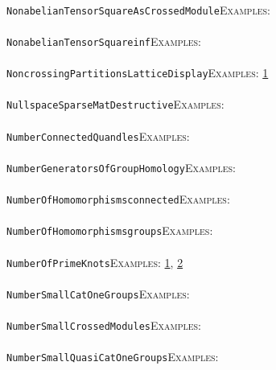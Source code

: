 \documentclass[a4paper,11pt]{report}
\begin{document}
{{ \\
 \texttt{NonabelianTensorSquareAsCrossedModule}{\nobreakspace}{\nobreakspace}{\nobreakspace}{\nobreakspace}\textsc{Examples:} \\
 \\
 \texttt{NonabelianTensorSquare{\textunderscore}inf}{\nobreakspace}{\nobreakspace}{\nobreakspace}{\nobreakspace}\textsc{Examples:} \\
 \\
 \texttt{NoncrossingPartitionsLatticeDisplay}{\nobreakspace}{\nobreakspace}{\nobreakspace}{\nobreakspace}\textsc{Examples:} \href{../www/SideLinks/About/aboutNoncrossing.html} {1}{\nobreakspace} \\
 \\
 \texttt{NullspaceSparseMatDestructive}{\nobreakspace}{\nobreakspace}{\nobreakspace}{\nobreakspace}\textsc{Examples:} \\
 \\
 \texttt{NumberConnectedQuandles}{\nobreakspace}{\nobreakspace}{\nobreakspace}{\nobreakspace}\textsc{Examples:} \\
 \\
 \texttt{NumberGeneratorsOfGroupHomology}{\nobreakspace}{\nobreakspace}{\nobreakspace}{\nobreakspace}\textsc{Examples:} \\
 \\
 \texttt{NumberOfHomomorphisms{\textunderscore}connected}{\nobreakspace}{\nobreakspace}{\nobreakspace}{\nobreakspace}\textsc{Examples:} \\
 \\
 \texttt{NumberOfHomomorphisms{\textunderscore}groups}{\nobreakspace}{\nobreakspace}{\nobreakspace}{\nobreakspace}\textsc{Examples:} \\
 \\
 \texttt{NumberOfPrimeKnots}{\nobreakspace}{\nobreakspace}{\nobreakspace}{\nobreakspace}\textsc{Examples:} \href{../www/SideLinks/About/aboutQuandles2.html} {1}{\nobreakspace}, \href{../www/SideLinks/About/aboutQuandles.html} {2}{\nobreakspace} \\
 \\
 \texttt{NumberSmallCatOneGroups}{\nobreakspace}{\nobreakspace}{\nobreakspace}{\nobreakspace}\textsc{Examples:} \\
 \\
 \texttt{NumberSmallCrossedModules}{\nobreakspace}{\nobreakspace}{\nobreakspace}{\nobreakspace}\textsc{Examples:} \\
 \\
 \texttt{NumberSmallQuasiCatOneGroups}{\nobreakspace}{\nobreakspace}{\nobreakspace}{\nobreakspace}\textsc{Examples:} \\
}}
\end{document}
